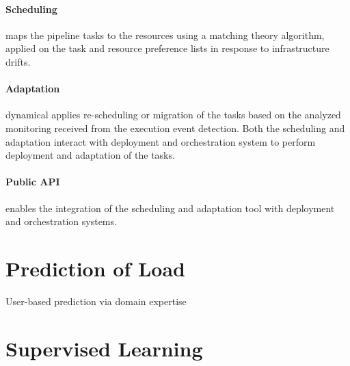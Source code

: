         \paragraph{Scheduling } maps the pipeline tasks to the resources using a matching theory algorithm, applied on the task and resource preference lists in response to infrastructure drifts.

        \paragraph{Adaptation } dynamical applies re-scheduling or migration of the tasks based on the analyzed monitoring received from the execution event detection. Both the scheduling and adaptation interact with deployment and orchestration system to perform deployment and adaptation of the tasks.

        \paragraph{Public API } enables the integration of the \SAA{} scheduling and adaptation tool with deployment and orchestration systems. \cite{kimovskiBigDataPipeline2022}

    \section{Prediction of Load}
    \label{sec:prediction-of-load-background}

        User-based prediction via domain expertise

    \section{Supervised Learning}
    \label{sec:supervised-learning}

